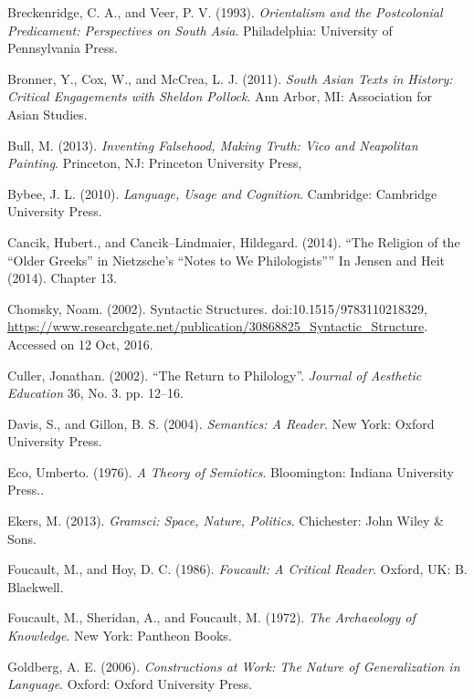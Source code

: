 \begin{thebibliography}{99}
 Breckenridge, C. A., and Veer, P. V. (1993). \textit{Orientalism and the Postcolonial Predicament: Perspectives on South Asia}. Philadelphia: University of Pennsylvania Press.

  Bronner, Y., Cox, W., and McCrea, L. J. (2011). \textit{South Asian Texts in History: Critical Engagements with Sheldon Pollock}. Ann Arbor, MI: Association for Asian Studies.

  Bull, M. (2013). \textit{Inventing Falsehood, Making Truth: Vico and Neapolitan Painting}. Princeton, NJ: Princeton University Press,

  Bybee, J. L. (2010). \textit{Language, Usage and Cognition}. Cambridge: Cambridge University Press.

  Cancik, Hubert., and Cancik–Lindmaier, Hildegard. (2014). “The Religion of the “Older Greeks” in Nietzsche’s “Notes to We Philologists”” In Jensen and Heit (2014). Chapter 13.

  Chomsky, Noam. (2002). Syntactic Structures. doi:10.1515/9783110218329, \url{https://www.researchgate.net/publication/30868825_Syntactic_Structure}. Accessed on 12 Oct, 2016.

  Culler, Jonathan. (2002). “The Return to Philology”. \textit{Journal of Aesthetic Education} 36, No. 3. pp. 12–16.

  Davis, S., and Gillon, B. S. (2004). \textit{Semantics: A Reader}. New York: Oxford University Press.

  Eco, Umberto. (1976). \textit{A Theory of Semiotics}. Bloomington: Indiana University Press..

  Ekers, M. (2013). \textit{Gramsci: Space, Nature, Politics}. Chichester: John Wiley \& Sons.

  Foucault, M., and Hoy, D. C. (1986). \textit{Foucault: A Critical Reader}. Oxford, UK: B. Blackwell.

  Foucault, M., Sheridan, A., and Foucault, M. (1972). \textit{The Archaeology of Knowledge}. New York: Pantheon Books.

  Goldberg, A. E. (2006). \textit{Constructions at Work: The Nature of Generalization in Language}. Oxford: Oxford University Press.


\end{thebibliography}
